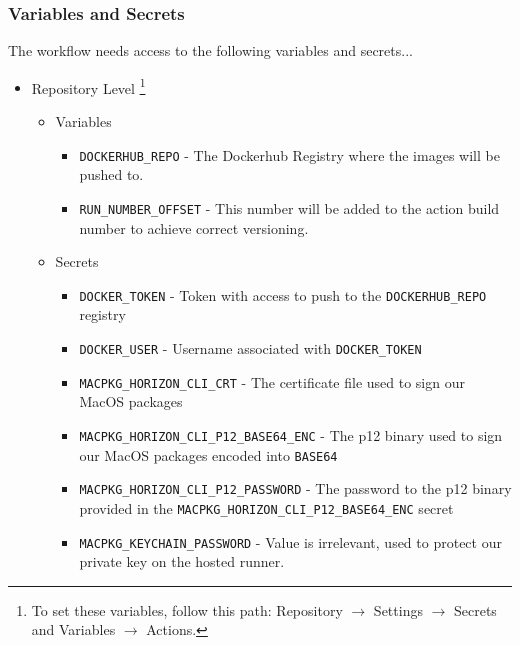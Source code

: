 \documentclass[a4paper,11pt]{article}
\begin{document}
\subsubsection{Variables and Secrets}
The workflow needs access to the following variables and secrets...
\begin{itemize}
    \item Repository Level \footnote{To set these variables, follow this path: Repository $\rightarrow$ Settings $\rightarrow$ Secrets and Variables $\rightarrow$ Actions.}
    \begin{itemize}
        \item Variables
        \begin{itemize}
            \item\verb|DOCKERHUB_REPO| - The Dockerhub Registry where the images will be pushed to.
            \item\verb|RUN_NUMBER_OFFSET| - This number will be added to the action build number to achieve correct versioning.
        \end{itemize}
        \item Secrets
        \begin{itemize}
            \item\verb|DOCKER_TOKEN| - Token with access to push to the \verb|DOCKERHUB_REPO| registry
            \item\verb|DOCKER_USER| - Username associated with \verb|DOCKER_TOKEN|
            \item\verb|MACPKG_HORIZON_CLI_CRT| - The certificate file used to sign our MacOS packages
            \item\verb|MACPKG_HORIZON_CLI_P12_BASE64_ENC| - The p12 binary used to sign our MacOS packages encoded into \verb|BASE64|
            \item\verb|MACPKG_HORIZON_CLI_P12_PASSWORD| - The password to the p12 binary provided in the \verb|MACPKG_HORIZON_CLI_P12_BASE64_ENC| secret
            \item\verb|MACPKG_KEYCHAIN_PASSWORD| - Value is irrelevant, used to protect our private key on the hosted runner.
        \end{itemize}
    \end{itemize}
\end{itemize}
\end{document}

